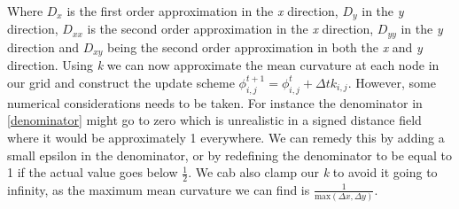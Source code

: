 Where $D_x$ is the first order approximation in the \textit{x} direction, $D_y$ in the \textit{y} direction, $D_{xx}$ is the second order approximation in the \textit{x} direction, $D_{yy}$ in the \textit{y} direction and $D_{xy}$ being the second order approximation in both the \textit{x} and \textit{y} direction. Using \textit{k} we can now approximate the mean curvature at each node in our grid and construct the update scheme $\phi_{i,j}^{t+1} = \phi_{i,j}^t + \Delta t k_{i,j}$. However, some numerical considerations needs to be taken. For instance the denominator in \autoref{denominator} might go to zero which is unrealistic in a signed distance field where it would be approximately 1 everywhere. We can remedy this by adding a small epsilon in the denominator, or by redefining the denominator to be equal to 1 if the actual value goes below $\frac{1}{2}$. We cab also clamp our \textit{k} to avoid it going to infinity, as the maximum mean curvature we can find is $\frac{1}{\text{max}(\Delta x, \Delta y)}$. 